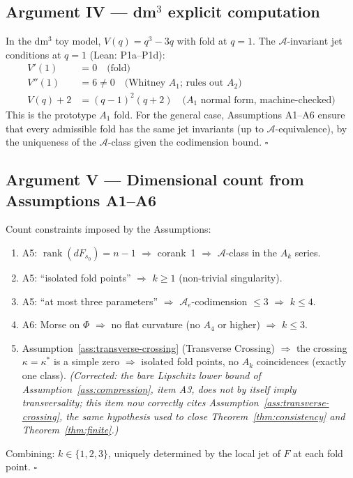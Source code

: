 \documentclass[14pt,a4paper]{extarticle}
\begin{document}
\subsection*{Argument IV\; — dm$^3$ explicit computation}

In the dm$^3$ toy model, $V(q) = q^3 - 3q$ with fold at $q=1$.
The $\mathcal{A}$-invariant jet conditions at $q=1$ (Lean: P1a--P1d):
\begin{align*}
  V'(1) &= 0 \quad\text{(fold)} \\
  V''(1) &= 6 \ne 0 \quad\text{(Whitney $A_1$; rules out $A_2$)} \\
  V(q)+2 &= (q-1)^2(q+2) \quad\text{($A_1$ normal form, machine-checked)}
\end{align*}
This is the prototype $A_1$ fold.  For the general case, Assumptions A1--A6
ensure that every admissible fold has the same jet invariants (up to
$\mathcal{A}$-equivalence), by the uniqueness of the $\mathcal{A}$-class
given the codimension bound.  \hfill $\square$

\subsection*{Argument V\; — Dimensional count from Assumptions A1--A6}

Count constraints imposed by the Assumptions:
\begin{enumerate}
  \item A5: $\operatorname{rank}(dF_{s_0}) = n - 1$ $\Rightarrow$ corank~1 $\Rightarrow$ $\mathcal{A}$-class in the $A_k$ series.
  \item A5: ``isolated fold points'' $\Rightarrow$ $k \ge 1$ (non-trivial singularity).
  \item A5: ``at most three parameters'' $\Rightarrow$ $\mathcal{A}_e$-codimension $\le 3$ $\Rightarrow$ $k \le 4$.
  \item A6: Morse on $\Phi$ $\Rightarrow$ no flat curvature (no $A_4$ or higher) $\Rightarrow$ $k \le 3$.
  \item Assumption~\ref{ass:transverse-crossing} (Transverse Crossing) $\Rightarrow$ the crossing $\kappa=\kappa^*$ is a simple zero $\Rightarrow$ isolated fold points, no $A_k$ coincidences (exactly one class). \emph{(Corrected: the bare Lipschitz lower bound of Assumption~\ref{ass:compression}, item A3, does not by itself imply transversality; this item now correctly cites Assumption~\ref{ass:transverse-crossing}, the same hypothesis used to close Theorem~\ref{thm:consistency} and Theorem~\ref{thm:finite}.)}
\end{enumerate}
Combining: $k \in \{1, 2, 3\}$, uniquely determined by the local jet of $F$ at each fold point.  \hfill $\square$
\end{document}
